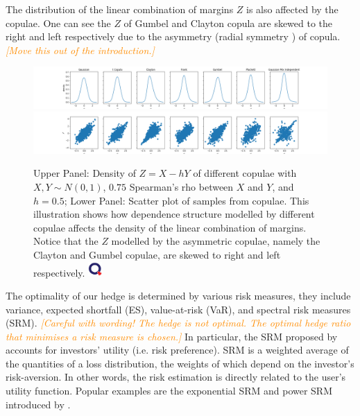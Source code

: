 \documentclass[11pt,a4paper,english]{article}
\providecommand{\natp}[1]{\textcolor{darkorange}{#1}}
\begin{document}
The distribution of the linear combination of margins $Z$ is also affected by the copulae.
One can see the $Z$ of Gumbel and Clayton copula are skewed to the right and left respectively due to the
asymmetry (radial symmetry \citet{Nelsen1999}) of copula.\natp{\em
  [Move this out of the introduction.]}
\medskip

\begin{figure}[h]
\includegraphics[width=\textwidth]{_pics/density illustration1.png}
\includegraphics[width=\textwidth]{_pics/density illustration2.png}
  \caption{Upper Panel: Density of $Z= X - hY$ of different copulae with
  $X, Y \sim N(0,1)$,
  $0.75$ Spearman's rho between $X$ and $Y$, and $h=0.5$;
  Lower Panel: Scatter plot of samples from copulae.
  This illustration shows how dependence structure modelled by different copulae affects the density of the linear combination
  of margins.
  Notice that the $Z$ modelled by the asymmetric copulae, namely the Clayton and Gumbel copulae, are skewed to right
  and left respectively. \href{http://www.quantlet.com/}{\includegraphics[width=15pt]{_pics/qletlogo_tr.png}}}
\label{fig:density illustration}
\end{figure}


The optimality of our hedge is determined by various risk measures,
they include variance, expected shortfall (ES), value-at-risk (VaR),
and spectral risk measures (SRM). \natp{\em [Careful with wording! The
  hedge is not optimal. The optimal hedge ratio that minimises a risk measure is chosen.]}
In particular, the SRM proposed by \citet{Acerbi2002} accounts for investors' utility (i.e. risk preference).
SRM is a weighted average of the quantities of a loss distribution, the weights of which depend on the investor's risk-aversion.
In other words, the risk estimation is directly related to the user's utility function.
Popular examples are the exponential SRM and power SRM introduced by
\citet{dowd2008spectral}. \medskip
\end{document}
